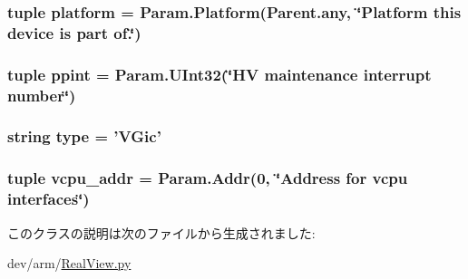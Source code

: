 \label{classRealView_1_1VGic_a975673739b7ec6d13ec341b77941a070}
\hypertarget{classRealView_1_1VGic_ae6d09ca44893db6cdb66d62deaa1aefd}{
\subsubsection[{platform}]{\setlength{\rightskip}{0pt plus 5cm}tuple {\bf platform} = Param.Platform(Parent.any, \char`\"{}Platform this device is part of.\char`\"{})}}
\label{classRealView_1_1VGic_ae6d09ca44893db6cdb66d62deaa1aefd}
\hypertarget{classRealView_1_1VGic_aa7766a38b2affe232e930ced4510c8b1}{
\subsubsection[{ppint}]{\setlength{\rightskip}{0pt plus 5cm}tuple {\bf ppint} = Param.UInt32(\char`\"{}HV maintenance interrupt number\char`\"{})}}
\label{classRealView_1_1VGic_aa7766a38b2affe232e930ced4510c8b1}
\hypertarget{classRealView_1_1VGic_acce15679d830831b0bbe8ebc2a60b2ca}{
\subsubsection[{type}]{\setlength{\rightskip}{0pt plus 5cm}string {\bf type} = '{\bf VGic}'}}
\label{classRealView_1_1VGic_acce15679d830831b0bbe8ebc2a60b2ca}
\hypertarget{classRealView_1_1VGic_acb5766da7783d2a6344f634943031b49}{
\subsubsection[{vcpu\_\-addr}]{\setlength{\rightskip}{0pt plus 5cm}tuple {\bf vcpu\_\-addr} = {\bf Param.Addr}(0, \char`\"{}Address for vcpu interfaces\char`\"{})}}
\label{classRealView_1_1VGic_acb5766da7783d2a6344f634943031b49}


このクラスの説明は次のファイルから生成されました:\begin{DoxyCompactItemize}
\item 
dev/arm/\hyperlink{RealView_8py}{RealView.py}\end{DoxyCompactItemize}
